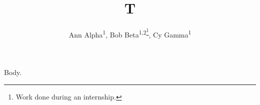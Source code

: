 \documentclass{article}
\begin{document}
\title{T}
\author{Ann Alpha\textsuperscript{\rm 1}, Bob Beta\textsuperscript{\rm 1,\rm 2\thanks{Work done during an internship.}}, Cy Gamma\textsuperscript{\rm 1}}
\maketitle
Body.
\end{document}
